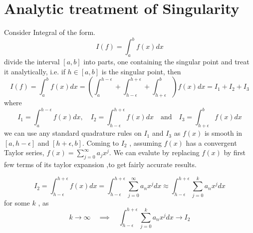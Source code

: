\documentclass[../document.tex]{subfiles}
\begin{document}
	\section{Analytic treatment of Singularity}
	
	Consider Integral of the form. 
	$$
	I(f) = \int_{a}^{b} f(x)dx
	$$
	divide the interval $[a,b]$ into parts, one containing the singular point and treat it analytically, i.e. if $h \in [a,b]$ is the singular point, then 
	$$
	I(f) =\int_{a}^{b} f(x)dx = \left( \int^{h - \epsilon}_{a} +\int^{h+\epsilon}_{h-\epsilon} + \int^{b}_{h + \epsilon} \right)  f(x)dx
	= I_1 + I_2 + I_3
	$$ 
	where
	$$
	I_1 = \int^{h - \epsilon}_{a} f(x)dx , \quad  I_2 = \int^{h+\epsilon}_{h-\epsilon} f(x)dx \quad \textrm{and} \quad
	I_3 = \int^{b}_{h + \epsilon} f(x)dx
	$$
	we can use any standard quadrature rules on $I_1$ and $I_3$ as $f(x)$ is smooth in 
	$[a,h-\epsilon]$ and $[h+\epsilon,b]$. Coming to $I_2$ , assuming $f(x)$ has a convergent Taylor series, $f(x) = \sum_{j = 0}^{\infty} a_j x^j$. We can evalute
	by replacing $f(x)$ by first few terms of its taylor expansion ,to get fairly accurate results.
	
	
	$$
	I_2 = \int_{h-\epsilon}^{h + \epsilon} f(x)dx 
	= \int_{h-\epsilon}^{h + \epsilon}\sum_{j = 0}^{\infty} a_n x^j dx
	\approx  \int_{h-\epsilon}^{h + \epsilon}\sum_{j = 0}^{k} a_n x^j dx
	$$
	for some $k$ , as 
	$$k\rightarrow \infty \quad \implies \quad
	\int_{h-\epsilon}^{h + \epsilon}\sum_{j = 0}^{k} a_n x^j dx \rightarrow I_2
	$$
	
\end{document}
